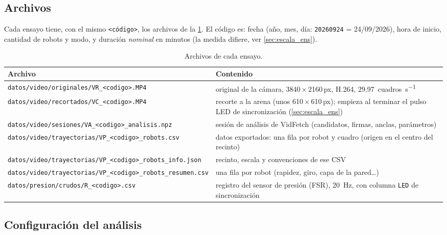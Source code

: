 \subsection{Archivos}

Cada ensayo tiene, con el mismo \texttt{<código>}, los archivos de la \cref{tab:archivos_ens}. El
código es: fecha (año, mes, día: \texttt{20260924} = 24/09/2026), hora de inicio, cantidad de robots
y modo, y duración \emph{nominal} en minutos (la medida difiere, ver \cref{sec:escala_ens}).

\begin{table}[H]
  \centering
  \caption{Archivos de cada ensayo.}
  \label{tab:archivos_ens}
  \small
  \begin{tabular}{@{}p{6.0cm}p{8.6cm}@{}}
    \toprule
    Archivo & Contenido \\
    \midrule
    \nolinkurl{datos/video/originales/VR_<codigo>.MP4} & original de la cámara, \num{3840}\,$\times$\,\num{2160}\,px, H.264, \SI{29.97}{cuadros\per\second} \\
    \nolinkurl{datos/video/recortados/VC_<codigo>.MP4} & recorte a la arena (unos \num{610}\,$\times$\,\num{610}\,px); empieza al terminar el pulso LED de sincronización (\cref{sec:escala_ens}) \\
    \nolinkurl{datos/video/sesiones/VA_<codigo>_analisis.npz} & sesión de análisis de VidFetch (candidatos, firmas, anclas, parámetros) \\
    \nolinkurl{datos/video/trayectorias/VP_<codigo>_robots.csv} & datos exportados: una fila por robot y cuadro (origen en el centro del recinto) \\
    \nolinkurl{datos/video/trayectorias/VP_<codigo>_robots_info.json} & recinto, escala y convenciones de ese CSV \\
    \nolinkurl{datos/video/trayectorias/VP_<codigo>_robots_resumen.csv} & una fila por robot (rapidez, giro, capa de la pared\ldots) \\
    \nolinkurl{datos/presion/crudos/R_<codigo>.csv} & registro del sensor de presión (FSR), \SI{20}{\hertz}, con columna \texttt{LED} de sincronización \\
    \bottomrule
  \end{tabular}
\end{table}

\subsection{Configuración del análisis}

